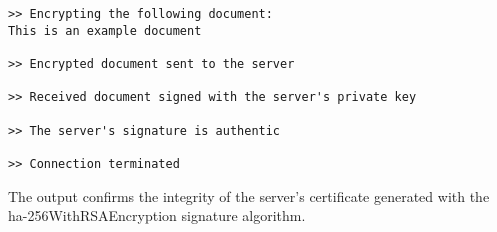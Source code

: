 \begin{verbatim}
>> Encrypting the following document:
This is an example document

>> Encrypted document sent to the server

>> Received document signed with the server's private key

>> The server's signature is authentic

>> Connection terminated
\end{verbatim}

The output confirms the integrity of the server's certificate generated with the ha-256WithRSAEncryption signature algorithm.